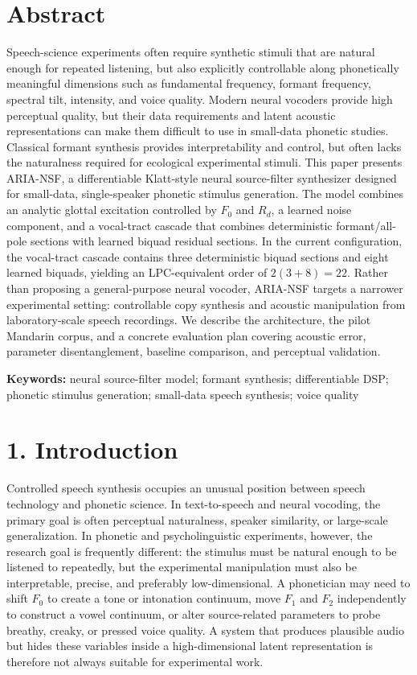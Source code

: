 \section{Abstract}\label{abstract}

Speech-science experiments often require synthetic stimuli that are
natural enough for repeated listening, but also explicitly controllable
along phonetically meaningful dimensions such as fundamental frequency,
formant frequency, spectral tilt, intensity, and voice quality. Modern
neural vocoders provide high perceptual quality, but their data
requirements and latent acoustic representations can make them difficult
to use in small-data phonetic studies. Classical formant synthesis
provides interpretability and control, but often lacks the naturalness
required for ecological experimental stimuli. This paper presents
ARIA-NSF, a differentiable Klatt-style neural source-filter synthesizer
designed for small-data, single-speaker phonetic stimulus generation.
The model combines an analytic glottal excitation controlled by \(F_0\)
and \(R_d\), a learned noise component, and a vocal-tract cascade that
combines deterministic formant/all-pole sections with learned biquad
residual sections. In the current configuration, the vocal-tract cascade
contains three deterministic biquad sections and eight learned biquads,
yielding an LPC-equivalent order of \(2(3+8)=22\). Rather than proposing
a general-purpose neural vocoder, ARIA-NSF targets a narrower
experimental setting: controllable copy synthesis and acoustic
manipulation from laboratory-scale speech recordings. We describe the
architecture, the pilot Mandarin corpus, and a concrete evaluation plan
covering acoustic error, parameter disentanglement, baseline comparison,
and perceptual validation.

\textbf{Keywords:} neural source-filter model; formant synthesis;
differentiable DSP; phonetic stimulus generation; small-data speech
synthesis; voice quality

\section{1. Introduction}\label{introduction}

Controlled speech synthesis occupies an unusual position between speech
technology and phonetic science. In text-to-speech and neural vocoding,
the primary goal is often perceptual naturalness, speaker similarity, or
large-scale generalization. In phonetic and psycholinguistic
experiments, however, the research goal is frequently different: the
stimulus must be natural enough to be listened to repeatedly, but the
experimental manipulation must also be interpretable, precise, and
preferably low-dimensional. A phonetician may need to shift \(F_0\) to
create a tone or intonation continuum, move \(F_1\) and \(F_2\)
independently to construct a vowel continuum, or alter source-related
parameters to probe breathy, creaky, or pressed voice quality. A system
that produces plausible audio but hides these variables inside a
high-dimensional latent representation is therefore not always suitable
for experimental work.

